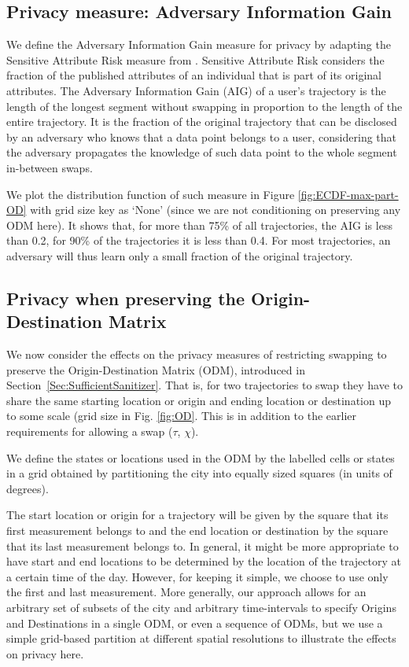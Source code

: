 \documentclass[times,twocolumn,final,authoryear]{elsarticle}
\begin{document}
\subsection{Privacy measure: Adversary Information Gain}\label{Sec:InfoGain}
 
We define the Adversary Information Gain measure for privacy by adapting the Sensitive Attribute Risk measure from \cite{Salas:2019}. Sensitive Attribute Risk considers the fraction of the published attributes of an individual that is part of its original attributes. 
The Adversary Information Gain (AIG) of a user's trajectory is the length of the longest segment without swapping in proportion to the length of the entire trajectory. It is the fraction of the original trajectory that can be disclosed by an adversary who knows that a data point belongs to a user, considering that the adversary propagates the knowledge of such data point to the whole segment in-between swaps. 

We plot the distribution function of such measure in Figure \ref{fig:ECDF-max-part-OD} with grid size key as `None' (since we are not conditioning on preserving any ODM here). 
It shows that, for more than 75\% of all
trajectories, the AIG is less than 0.2, for 90\% of the trajectories it is less
than 0.4. For most trajectories, an adversary will thus learn only a
small fraction of the original trajectory. 


\subsection{Privacy when preserving the Origin-Destination Matrix}\label{S:PrivacyODM}
We now consider the effects on the privacy measures of restricting 
swapping to preserve the Origin-Destination Matrix (ODM), introduced in Section~\ref{Sec:SufficientSanitizer}. That is, for two trajectories to
swap they have to share the same starting location or origin and ending location or destination up to some scale (grid size in Fig. \ref{fig:OD}.  
This is in addition to the earlier requirements for allowing a swap ($\tau$, $\chi$).

We define the states or locations used in the ODM by the labelled cells or states in a grid obtained by partitioning the
city into equally sized squares (in units of degrees).  

The start location or origin for a trajectory will be given by the square that its first
measurement belongs to and the end location or destination by the square that its last
measurement belongs to. 
In general, it might be more appropriate to
have start and end locations to be determined by the location of the
trajectory at a certain time of the day. 
However, for keeping it
simple, we choose to use only the first and last measurement.
More generally, our approach allows for an arbitrary set of subsets of the city and arbitrary time-intervals to specify Origins and Destinations in a single ODM, or even a sequence of ODMs, but we use a simple grid-based partition at different spatial resolutions to illustrate the effects on privacy here.  
\end{document}
